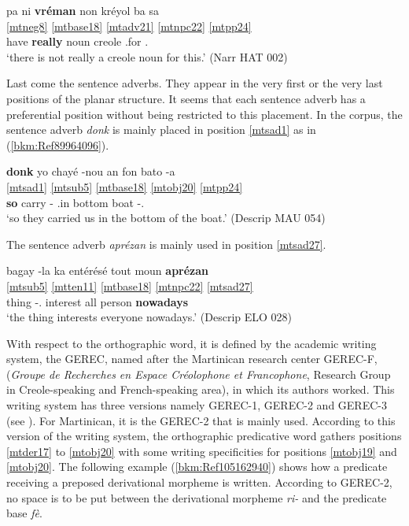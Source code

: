 \documentclass[output=paper]{langscibook}
\begin{document}
\ea\label{bkm:Ref89977050}
\glll pa ni \textbf{vréman} non kréyol ba sa\\
\ref{mtneg8} \ref{mtbase18} \ref{mtadv21} \ref{mtnpc22} {} \ref{mtpp24} {} \\ 
\Neg{} have \textbf{really} noun creole \Prep{}.for \Dem{}.\Pr{}\\
\glt `there is not really a creole noun for this.' (Narr HAT 002)
\z

Last come the sentence adverbs. They appear in the very first or the very last positions of the planar structure. It seems that each sentence adverb has a preferential position without being restricted to this placement. In the corpus, the sentence adverb \textit{donk} is mainly placed in position \ref{mtsad1} as in (\ref{bkm:Ref89964096}).

\ea\label{bkm:Ref89964096}
\glll\textbf{donk} yo chayé -nou an fon bato -a\\
\ref{mtsad1} \ref{mtsub5} \ref{mtbase18} \ref{mtobj20} \ref{mtpp24} {} {} {} \\
\textbf{so} \Third\Pl{} carry -\First\Pl{} \Prep{}.in bottom boat -\Def.\Art{}\\
\glt `so they carried us in the bottom of the boat.' (Descrip MAU 054)
\z

The sentence adverb \textit{aprézan} is mainly used in position \ref{mtsad27}.

\ea\label{ex:mart:key:14'}
\glll bagay -la ka entérésé tout moun \textbf{aprézan}\\
\ref{mtsub5} {} \ref{mtten11} \ref{mtbase18} \ref{mtnpc22} {} \ref{mtsad27}\\
thing -\Def.\Art{} \Impf{} interest all person \textbf{nowadays}\\
\glt `the thing interests everyone nowadays.' (Descrip ELO 028)
\z

With respect to the orthographic word, it is defined by the academic writing system, the GEREC, named after the Martinican research center GEREC-F, (\textit{Groupe de Recherches en Espace Créolophone et Francophone}, Research Group in Creole-speaking and French-speaking area), in which its authors worked. This writing system has three versions namely GEREC-1, GEREC-2 and GEREC-3 (see \citealt{Zribi-Hertz2017}). For Martinican, it is the GEREC-2 that is mainly used. According to this version of the writing system, the orthographic predicative word gathers positions \ref{mtder17} to \ref{mtobj20} with some writing specificities for positions \ref{mtobj19} and \ref{mtobj20}. The following example (\ref{bkm:Ref105162940}) shows how a predicate receiving a preposed derivational morpheme is written. According to GEREC-2, no space is to be put between the derivational morpheme \textit{ri-} and the predicate base \textit{fè}.
\end{document}
